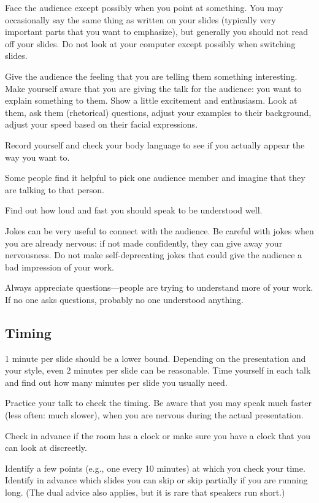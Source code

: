 \documentclass[12pt]{article}
\begin{document}
Face the audience except possibly when you point at something.
You may occasionally say the same thing as written on your slides (typically very important parts that you want to emphasize), but generally you should not read off your slides.
Do not look at your computer except possibly when switching slides.
\medskip

Give the audience the feeling that you are telling them something interesting.
Make yourself aware that you are giving the talk for the audience: you want to explain something to them.
Show a little excitement and enthusiasm.
Look at them, ask them (rhetorical) questions, adjust your examples to their background, adjust your speed based on their facial expressions.
\medskip

Record yourself and check your body language to see if you actually appear the way you want to.
\medskip

Some people find it helpful to pick one audience member and imagine that they are talking to that person.
\medskip

Find out how loud and fast you should speak to be understood well.
\medskip

Jokes can be very useful to connect with the audience.
Be careful with jokes when you are already nervous: if not made confidently, they can give away your nervousness.
Do not make self-deprecating jokes that could give the audience a bad impression of your work.
\medskip

Always appreciate questions---people are trying to understand more of your work.
If no one asks questions, probably no one understood anything.

\subsection{Timing}

1 minute per slide should be a lower bound.
Depending on the presentation and your style, even 2 minutes per slide can be reasonable.
Time yourself in each talk and find out how many minutes per slide you usually need.
\medskip

Practice your talk to check the timing.
Be aware that you may speak much faster (less often: much slower), when you are nervous during the actual presentation.
\medskip

Check in advance if the room has a clock or make sure you have a clock that you can look at discreetly.
\medskip

Identify a few points (e.g., one every 10 minutes) at which you check your time.
Identify in advance which slides you can skip or skip partially if you are running long.
(The dual advice also applies, but it is rare that speakers run short.)
\end{document}
